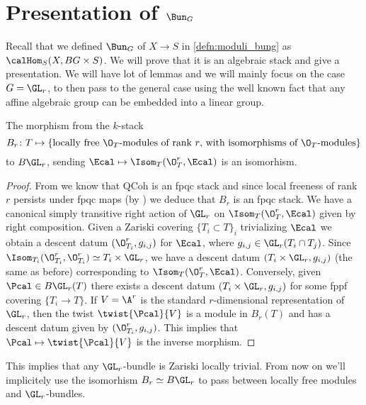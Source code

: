     \section{\texorpdfstring{Presentation of $\Bun_G$}{Presentation of the stack of G-bundles}}
        Recall that we defined $\Bun_G$ of $X \to S$ in \cref{defn:moduli_bung} as $\calHom_S(X, BG \times S)$. We will prove that it is an algebraic stack and give a presentation. We will have lot of lemmas and we will mainly focus on the case $G = \GL_r$, to then pass to the general case using the well known fact that any affine algebraic group can be embedded into a linear group.

        \begin{lemma}
            \label{lemma:wang_4_1_1}
            The morphism from the $k$-stack
            \[ B_r\colon T \mapsto \{\text{locally free $\O_T$-modules of rank $r$, with isomorphisms of $\O_T$-modules} \}\] to $B\GL_r$, sending $\Ecal \mapsto \Isom_T(\O_T^r, \Ecal)$ is an isomorhism.
        \end{lemma}
        \begin{proof}
            From \cite[Theorem~4.2.3]{Vist:desc} we know that $\textrm{QCoh}$ is an fpqc stack and since local freeness of rank $r$ persists under fpqc maps (by \cite[Tome~2, Proposition~2.5.2]{EGA4}) we deduce that $B_r$ is an fpqc stack. We have a canonical simply transitive right action of $\GL_r$ on $\Isom_T(\O_T^r, \Ecal)$ given by right composition. Given a Zariski covering $\{T_i \subset T\}_i$ trivializing $\Ecal$ we obtain a descent datum $(\O_{T_i}^r, g_{i,j})$ for $\Ecal$, where $g_{i,j} \in \GL_r(T_i \cap T_j)$. Since $\Isom_{T_i}(\O_{T_i}^r, \O_{T_i}^r) \simeq T_i \times \GL_r$, we have a descent datum $(T_i \times \GL_r, g_{i,j})$ (the same as before) corresponding to $\Isom_T(\O_T^r, \Ecal)$.
            Conversely, given $\Pcal \in B\GL_r(T)$ there exists a descent datum $(T_i \times \GL_r, g_{i,j})$ for some fppf covering $\{T_i \to T\}$. If $V = \A^r$ is the standard $r$-dimensional representation of $\GL_r$, then the twist $\twist{\Pcal}{V}$ is a module in $B_r(T)$ and has a descent datum given by $(\O_{T_i}^r, g_{i,j})$. This implies that $\Pcal \mapsto \twist{\Pcal}{V}$ is the inverse morphism.
        \end{proof}

        This implies that any $\GL_r$-bundle is Zariski locally trivial. From now on we'll implicitely use the isomorhism $B_r \simeq B\GL_r$ to pass between locally free modules and $\GL_r$-bundles. 


